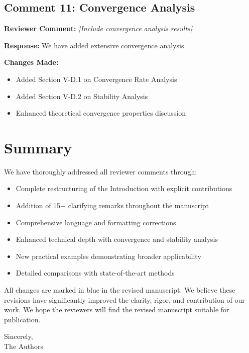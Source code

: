 \documentclass[11pt]{article}
\newcommand{\reviewercomment}[1]{\textbf{Reviewer Comment:} \textit{#1}}
\newcommand{\response}[1]{\textbf{Response:} #1}
\newcommand{\changes}[1]{\textbf{Changes Made:} #1}
\begin{document}
\subsection*{Comment 11: Convergence Analysis}

\reviewercomment{[Include convergence analysis results]}

\response{We have added extensive convergence analysis.}

\changes{
\begin{itemize}
\item Added Section V-D.1 on Convergence Rate Analysis
\item Added Section V-D.2 on Stability Analysis
\item Enhanced theoretical convergence properties discussion
\end{itemize}
}

\section*{Summary}

We have thoroughly addressed all reviewer comments through:
\begin{itemize}
\item Complete restructuring of the Introduction with explicit contributions
\item Addition of 15+ clarifying remarks throughout the manuscript
\item Comprehensive language and formatting corrections
\item Enhanced technical depth with convergence and stability analysis
\item New practical examples demonstrating broader applicability
\item Detailed comparisons with state-of-the-art methods
\end{itemize}

All changes are marked in {\color{blue}blue} in the revised manuscript. We believe these revisions have significantly improved the clarity, rigor, and contribution of our work. We hope the reviewers will find the revised manuscript suitable for publication.

\vspace{1em}
\noindent Sincerely,\\
The Authors
\end{document}
